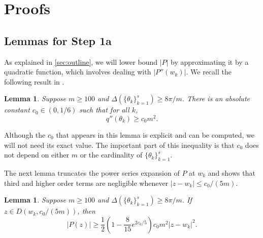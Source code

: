 \documentclass[11pt]{article}
\newtheorem{lemma}[theorem]{Lemma}
\theoremstyle{definition}
\numberwithin{theorem}{section}
\numberwithin{equation}{section}
\newcommand{\noteW}[1]{\textcolor{purple}{{\textbf{Weilin:} #1}}}
\numberwithin{equation}{section}
\begin{document}


\section{Proofs}
\label{sec:proofs} 

\subsection{Lemmas for Step 1a}

As explained in \cref{sec:outline}, we will lower bound $|P|$ by approximating it by a quadratic function, which involves dealing with $|P''(w_k)|$. We recall the following result in \cite[Lemma 9.4]{fannjiang2025optimality}.

\begin{lemma} \label{lem:q''}
    Suppose $m\geq 100$ and $\Delta(\{\theta_k\}_{k=1}^s)\geq 8\pi/m$. There is an absolute constant $c_0\in (0,1/6)$ such that for all $k$, 
    $$
    q''(\theta_k) \geq c_0 m^2. 
    $$
\end{lemma}

Although the $c_0$ that appears in this lemma is explicit and can be computed, we will not need its exact value. The important part of this inequality is that $c_0$ does not depend on either $m$ or the cardinality of $\{\theta_k\}_{k=1}^s$. 

The next lemma truncates the power series expansion of $P$ at $w_k$ and shows that third and higher order terms are negligible whenever $|z-w_k|\leq c_0/(5m)$.

\begin{lemma}\label{lem:Ppowerdisk}
    Suppose $m\geq 100$ and $\Delta(\{\theta_k\}_{k=1}^s)\geq 8\pi/m$. If $z\in D(w_k,c_0/(5m))$, then 
    $$
    |P(z)|
    \geq \frac 12 \left( 1 - \frac{8}{15} e^{2c_0/5}\right) c_0 m^2 |z-w_k|^2. 
    $$
\end{lemma}
\end{document}
